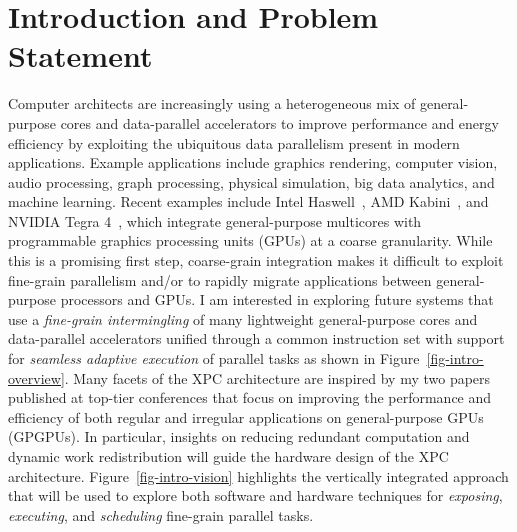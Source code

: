 
\section{Introduction and Problem Statement}
\label{sec-intro}


Computer architects are increasingly using a heterogeneous mix of
general-purpose cores and data-parallel accelerators to improve
performance and energy efficiency by exploiting the ubiquitous data
parallelism present in modern applications. Example applications include
graphics rendering, computer vision, audio processing, graph processing,
physical simulation, big data analytics, and machine learning. Recent
examples include Intel
Haswell~\cite{hammarlund-intel-haswell-ieeemicro2014}, AMD
Kabini~\cite{bouvier-amd-kabini-ieeemicro2014}, and NVIDIA Tegra
4~\cite{krewell-nvidia-tegra4-mpr2013}, which integrate general-purpose
multicores with programmable graphics processing units (GPUs) at a coarse
granularity. While this is a promising first step, coarse-grain
integration makes it difficult to exploit fine-grain parallelism and/or
to rapidly migrate applications between general-purpose processors and
GPUs. I am interested in exploring future systems that use a
\emph{fine-grain intermingling} of many lightweight general-purpose cores
and data-parallel accelerators unified through a common instruction set
with support for \emph{seamless adaptive execution} of parallel tasks as
shown in Figure~\ref{fig-intro-overview}.    Many facets of the XPC architecture are
inspired by my two papers published at top-tier conferences that focus on
improving the performance and efficiency of both regular and irregular
applications on general-purpose GPUs (GPGPUs). In particular, insights on
reducing redundant computation and dynamic work redistribution will guide
the hardware design of the XPC architecture.
Figure~\ref{fig-intro-vision} highlights the vertically integrated
approach that will be used to explore both software and hardware
techniques for \emph{exposing}, \emph{executing}, and \emph{scheduling}
fine-grain parallel tasks.

